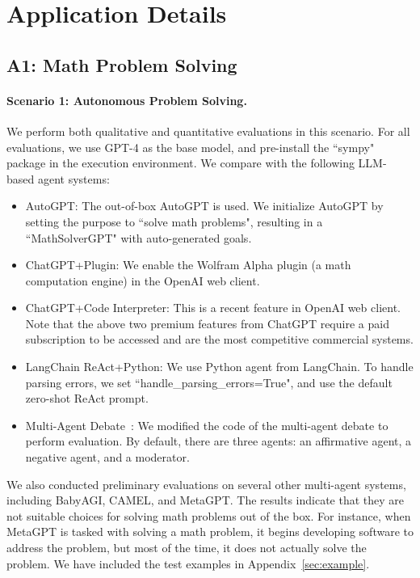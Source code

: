 \section{Application Details}
\label{append:application}

\subsection*{A1: Math Problem Solving} \label{appendix_sec:app:math}
 
 \paragraph{Scenario 1: Autonomous Problem Solving.} We perform both qualitative and quantitative evaluations in this scenario. For all evaluations, we use GPT-4 as the base model, and pre-install the ``sympy" package in the execution environment. We compare \libName with the following LLM-based agent systems:
 \begin{itemize}[leftmargin=*]
    \vspace{-1mm}
    \setlength\itemsep{-0.1em}
    \item AutoGPT: The out-of-box AutoGPT is used. We initialize AutoGPT by setting the purpose to ``solve math problems", resulting in a  ``MathSolverGPT" with auto-generated goals.
    \item ChatGPT+Plugin: We enable the Wolfram Alpha plugin (a math computation engine) in the OpenAI web client.
    \item ChatGPT+Code Interpreter: This is a recent feature in OpenAI web client. Note that the above two premium features from ChatGPT require a paid subscription to be accessed and are the most competitive commercial systems.  
    \item LangChain ReAct+Python: We use Python agent from LangChain. To handle parsing errors, we set ``handle\_parsing\_errors=True", and use the default zero-shot ReAct prompt.
    \item Multi-Agent Debate~\cite{liang-arxiv2023}: We modified the code of the multi-agent debate to perform evaluation. By default, there are three agents: an affirmative agent, a negative agent, and a moderator.
\end{itemize}
We also conducted preliminary evaluations on several other multi-agent systems, including BabyAGI, CAMEL, and MetaGPT. The results indicate that they are not suitable choices for solving math problems out of the box. For instance, when MetaGPT is tasked with solving a math problem, it begins developing software to address the problem, but most of the time, it does not actually solve the problem. We have included the test examples in Appendix~\ref{sec:example}.

